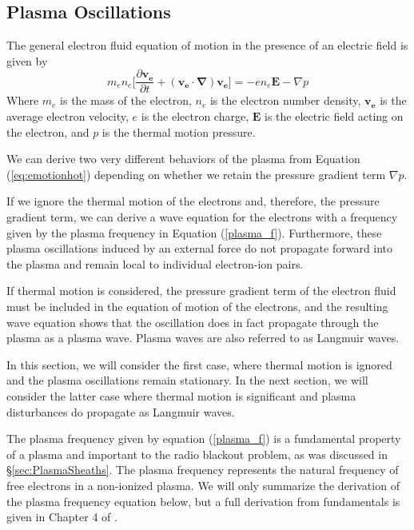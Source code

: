 \documentclass[twocolumn]{article}
\begin{document}
\subsection*{Plasma Oscillations}
The general electron fluid equation of motion in the presence of an electric field is given by
\begin{equation} \label{eq:emotionhot}
m_en_e \lbrack \frac{\partial \mathbf{v_e}}{\partial t} + \left( \mathbf{v_e} \cdot \mathbf{\nabla} \right) \mathbf{v_e} \rbrack = -en_e\mathbf{E} - \nabla p
\end{equation}
Where $m_e$ is the mass of the electron, $n_e$ is the electron number density, $\mathbf{v_e}$ is the average electron velocity, $e$ is the electron charge, $\mathbf{E}$ is the electric field acting on the electron, and $p$ is the thermal motion pressure.

We can derive two very different behaviors of the plasma from Equation (\ref{eq:emotionhot}) depending on whether we retain the pressure gradient term $\nabla p$.

If we ignore the thermal motion of the electrons and, therefore, the pressure gradient term, we can derive a wave equation for the electrons with a frequency given by the plasma frequency in Equation (\ref{plasma_f}).
Furthermore, these plasma oscillations induced by an external force do not propagate forward into the plasma and remain local to individual electron-ion pairs.

If thermal motion is considered, the pressure gradient term of the electron fluid must be included in the equation of motion of the electrons, and the resulting wave equation shows that the oscillation does in fact propagate through the plasma as a plasma wave.
Plasma waves are also referred to as Langmuir waves.

In this section, we will consider the first case, where thermal motion is ignored and the plasma oscillations remain stationary.
In the next section, we will consider the latter case where thermal motion is significant and plasma disturbances do propagate as Langmuir waves.


The plasma frequency given by equation (\ref{plasma_f}) is a fundamental property of a plasma and important to the radio blackout problem, as was discussed in \S\ref{sec:PlasmaSheaths}.
The plasma frequency represents the natural frequency of free electrons in a non-ionized plasma.
We will only summarize the derivation of the plasma frequency equation below, but a full derivation from fundamentals is given in Chapter 4 of \cite{chen_introduction_1984}.
\end{document}
